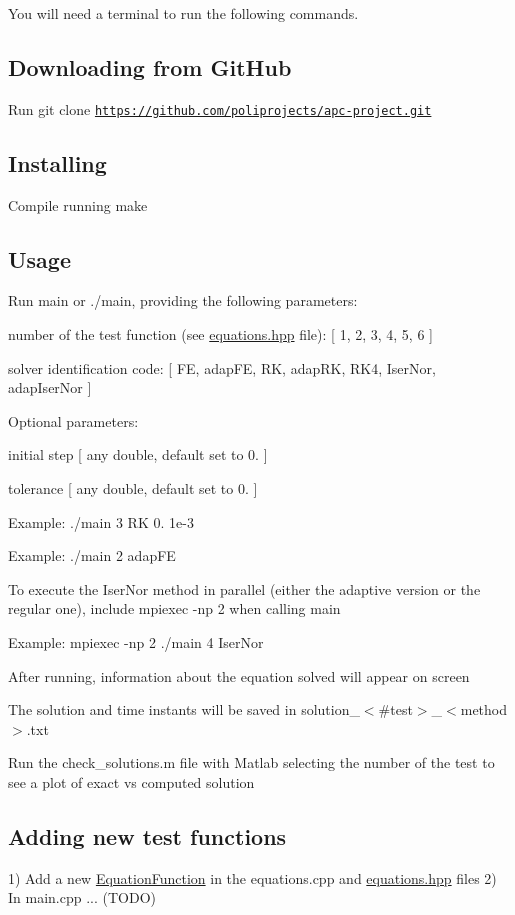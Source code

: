 You will need a terminal to run the following commands.

\subsection*{Downloading from Git\+Hub}

Run {\ttfamily git clone \href{https://github.com/poliprojects/apc-project.git}{\tt https\+://github.\+com/poliprojects/apc-\/project.\+git}}

\subsection*{Installing}

Compile running {\ttfamily make}

\subsection*{Usage}


\begin{DoxyItemize}
\item Run {\ttfamily main} or {\ttfamily ./main}, providing the following parameters\+:
\begin{DoxyItemize}
\item number of the test function (see {\ttfamily \hyperlink{equations_8hpp_source}{equations.\+hpp}} file)\+: \mbox{[} 1, 2, 3, 4, 5, 6 \mbox{]}
\item solver identification code\+: \mbox{[} FE, adap\+FE, RK, adap\+RK, R\+K4, Iser\+Nor, adap\+Iser\+Nor \mbox{]}
\end{DoxyItemize}
\item Optional parameters\+:
\begin{DoxyItemize}
\item initial step \mbox{[} any double, default set to 0. \mbox{]}
\item tolerance \mbox{[} any double, default set to 0. \mbox{]}
\end{DoxyItemize}
\item Example\+: {\ttfamily ./main 3 RK 0. 1e-\/3}
\item Example\+: {\ttfamily ./main 2 adap\+FE}
\item To execute the Iser\+Nor method in parallel (either the adaptive version or the regular one), include {\ttfamily mpiexec -\/np 2} when calling main
\item Example\+: {\ttfamily mpiexec -\/np 2 ./main 4 Iser\+Nor}
\item After running, information about the equation solved will appear on screen
\item The solution and time instants will be saved in solution\+\_\+$<$\#test$>$\+\_\+$<$method$>$.\+txt
\item Run the {\ttfamily check\+\_\+solutions.\+m} file with Matlab selecting the number of the test to see a plot of exact vs computed solution
\end{DoxyItemize}

\subsection*{Adding new test functions}

1) Add a new \hyperlink{structEquationFunction}{Equation\+Function} in the {\ttfamily equations.\+cpp} and {\ttfamily \hyperlink{equations_8hpp_source}{equations.\+hpp}} files 2) In main.\+cpp ... (T\+O\+DO) 